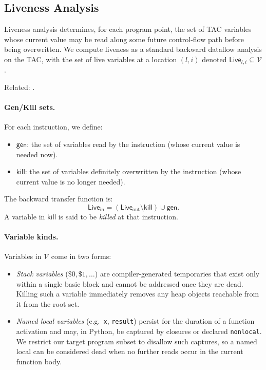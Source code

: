 \subsection{Liveness Analysis}
\label{sec:liveness}
Liveness analysis determines, for each program point, the set of TAC variables whose current value may be read along some future control-flow path before being overwritten.  
We compute liveness as a standard backward dataflow analysis on the TAC, with the set of live variables at a location $(l,i)$ denoted $\mathsf{Live}_{l,i} \subseteq \mathcal{V}$.

Related: \cite{pythonsemantics}.

\paragraph{Gen/Kill sets.}
For each instruction, we define:
\begin{itemize}
    \item $\mathsf{gen}$: the set of variables read by the instruction (whose current value is needed now).
    \item $\mathsf{kill}$: the set of variables definitely overwritten by the instruction (whose current value is no longer needed).
\end{itemize}
The backward transfer function is:
\[
\mathsf{Live}_{\mathrm{in}} = (\mathsf{Live}_{\mathrm{out}} \setminus \mathsf{kill}) \cup \mathsf{gen}.
\]
A variable in $\mathsf{kill}$ is said to be \emph{killed} at that instruction.

\paragraph{Variable kinds.}
Variables in $\mathcal{V}$ come in two forms:
\begin{itemize}
    \item \emph{Stack variables} ($\$0, \$1, \ldots$) are compiler-generated temporaries that exist only within a single basic block and cannot be addressed once they are dead.  
          Killing such a variable immediately removes any heap objects reachable from it from the root set.
    \item \emph{Named local variables} (e.g.\ \texttt{x}, \texttt{result}) persist for the duration of a function activation and may, in Python, be captured by closures or declared \texttt{nonlocal}.
          We restrict our target program subset to disallow such captures, so a named local can be considered dead when no further reads occur in the current function body.
\end{itemize}

